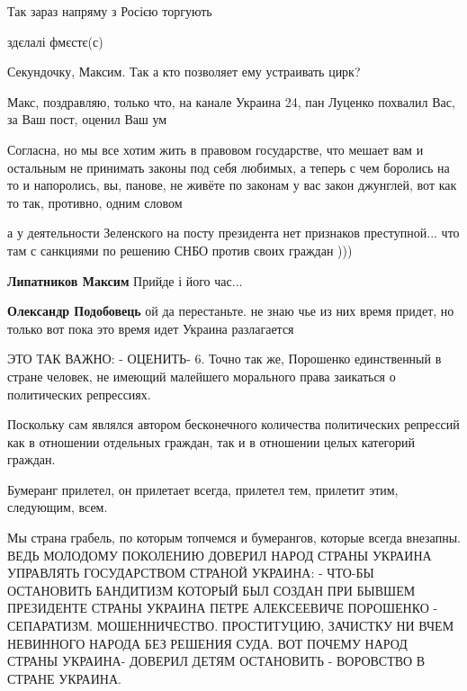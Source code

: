 \begin{itemize}
Так зараз напряму з Росією торгують

здєлалі фмєстє(с)

Секундочку, Максим. Так а кто позволяет ему устраивать цирк?

Макс, поздравляю, только что, на канале Украина 24, пан Луценко похвалил Вас, за Ваш пост, оценил Ваш ум


Согласна, но мы все хотим жить в правовом государстве, что мешает вам и остальным
не принимать законы под себя любимых, а теперь с чем боролись на то и
напоролись, вы, панове, не живёте по законам у вас закон джунглей, вот как то
так, противно, одним словом


а у деятельности Зеленского на посту президента нет признаков преступной... что
там с санкциями по решению СНБО против своих граждан )))

\begin{itemize} %
\textbf{Липатников Максим} Прийде і його час...

\textbf{Олександр Подобовець} ой да перестаньте. не знаю чье из них время придет, но только вот пока это время идет Украина разлагается
\end{itemize} %


ЭТО ТАК ВАЖНО: - ОЦЕНИТЬ- 6. Точно так же, Порошенко единственный в стране
человек, не имеющий малейшего морального права заикаться о политических
репрессиях.

Поскольку сам являлся автором бесконечного количества политических репрессий
как в отношении отдельных граждан, так и в отношении целых категорий граждан.

Бумеранг прилетел, он прилетает всегда, прилетел тем, прилетит этим, следующим,
всем.

Мы страна грабель, по которым топчемся и бумерангов, которые всегда внезапны.
ВЕДЬ МОЛОДОМУ ПОКОЛЕНИЮ ДОВЕРИЛ НАРОД СТРАНЫ УКРАИНА УПРАВЛЯТЬ ГОСУДАРСТВОМ
СТРАНОЙ УКРАИНА: - ЧТО-БЫ ОСТАНОВИТЬ БАНДИТИЗМ КОТОРЫЙ БЫЛ СОЗДАН ПРИ БЫВШЕМ
ПРЕЗИДЕНТЕ СТРАНЫ УКРАИНА ПЕТРЕ АЛЕКСЕЕВИЧЕ ПОРОШЕНКО - СЕПАРАТИЗМ.
МОШЕННИЧЕСТВО. ПРОСТИТУЦИЮ, ЗАЧИСТКУ НИ ВЧЕМ НЕВИННОГО НАРОДА БЕЗ РЕШЕНИЯ СУДА.
ВОТ ПОЧЕМУ НАРОД СТРАНЫ УКРАИНА- ДОВЕРИЛ ДЕТЯМ ОСТАНОВИТЬ - ВОРОВСТВО В СТРАНЕ
УКРАИНА.



\end{itemize}
